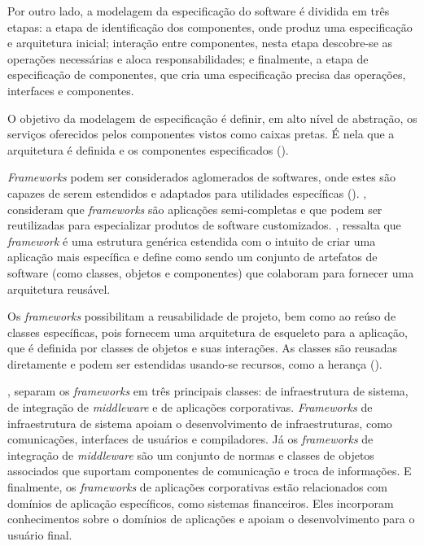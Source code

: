 Por outro lado, a modelagem da especificação do software é dividida em três etapas: a etapa de identificação dos componentes, onde produz uma especificação e arquitetura inicial; interação entre componentes, nesta etapa descobre-se as operações necessárias e aloca responsabilidades; e finalmente, a etapa de especificação de componentes, que cria uma especificação precisa das operações, interfaces e componentes.  

O objetivo da modelagem de especificação é definir, em alto nível de abstração, os serviços oferecidos pelos componentes vistos como caixas pretas. É nela que a arquitetura é definida e os componentes especificados (\cite{itana:2005}).

\textit{Frameworks} podem ser considerados aglomerados de softwares, onde estes são capazes de serem estendidos e adaptados para utilidades específicas (\cite{taligent:1994}). \cite{pree:1997}, consideram que  \textit{frameworks} são aplicações semi-completas e que podem ser reutilizadas para especializar produtos de software customizados. \cite{sommerville:2013}, ressalta que \textit{framework} é uma estrutura genérica estendida com o intuito de criar uma aplicação mais específica e \cite{schmidt:2004} define como sendo um conjunto de artefatos de software (como classes, objetos e componentes) que colaboram para fornecer uma arquitetura reusável.

Os \textit{frameworks} possibilitam a reusabilidade de projeto, bem como ao reúso de classes específicas, pois fornecem uma arquitetura de esqueleto para a aplicação, que é definida por classes de objetos e suas interações. As classes são reusadas diretamente e podem ser estendidas usando-se recursos, como a herança (\cite{sommerville:2013}). 

\cite{fayad:1997}, separam os \textit{frameworks} em três principais classes: de infraestrutura de sistema, de integração de \textit{middleware} e de aplicações corporativas. \textit{Frameworks} de infraestrutura de sistema apoiam o desenvolvimento de infraestruturas, como comunicações, interfaces de usuários e compiladores. Já os \textit{frameworks} de integração de \textit{middleware} são um conjunto de normas e classes de objetos associados que suportam componentes de comunicação e troca de informações. E finalmente, os \textit{frameworks} de aplicações corporativas estão relacionados com domínios de aplicação específicos, como sistemas financeiros. Eles incorporam conhecimentos sobre o domínios de aplicações e apoiam o desenvolvimento para o usuário final.

